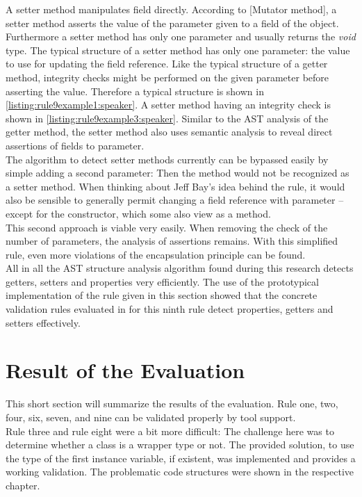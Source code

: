 A setter method manipulates field directly. According to \cite{wiki}[Mutator method], a setter method asserts the value of the parameter given to a field of the object. Furthermore a setter method has only one parameter and usually returns the \textit{void} type. The typical structure of a setter method has only one parameter: the value to use for updating the field reference. Like the typical structure of a getter method, integrity checks might be performed on the given parameter before asserting the value. Therefore a typical structure is shown in \ref{listing:rule9example1:speaker}. A setter method having an integrity check is shown in \ref{listing:rule9example3:speaker}. Similar to the \ac{AST} analysis of the getter method, the setter method also uses semantic analysis to reveal direct assertions of fields to parameter.
\\

The algorithm to detect setter methods currently can be bypassed easily by simple adding a second parameter: Then the method would not be recognized as a setter method. When thinking about Jeff Bay's idea behind the rule, it would also be sensible to generally permit changing a field reference with parameter -- except for the constructor, which some also view as a method. 
\\

This second approach is viable very easily. When removing the check of the number of parameters, the analysis of assertions remains. With this simplified rule, even more violations of the encapsulation principle can be found. 
\\

All in all the \ac{AST} structure analysis algorithm found during this research detects getters, setters and properties very efficiently. The use of the prototypical implementation of the rule given in this section showed that the concrete validation rules evaluated in for this ninth rule detect properties, getters and setters effectively. 

\section{Result of the Evaluation}
\label{e:result}
This short section will summarize the results of the evaluation. Rule one, two, four, six, seven, and nine can be validated properly by tool support. 
\\

Rule three and rule eight were a bit more difficult: The challenge here was to determine whether a class is a wrapper type or not. The provided solution, to use the type of the first instance variable, if existent, was implemented and provides a working validation. The problematic code structures were shown in the respective chapter.
\\

